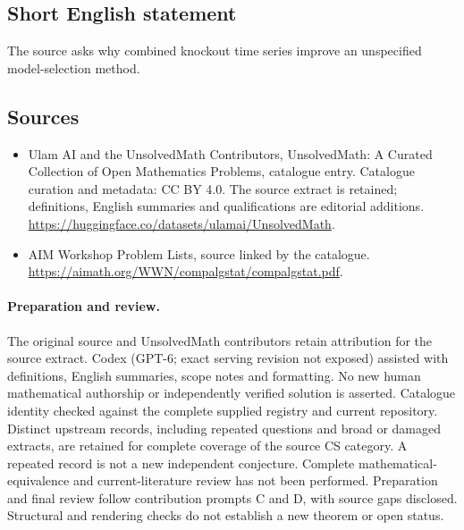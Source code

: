 \documentclass[11pt]{article}
\begin{document}
\subsection{Short English statement}
The source asks why combined knockout time series improve an unspecified model-selection method.
\subsection{Sources}
\begin{itemize}
\item[\hypertarget{source:statement:1}{S1}] Ulam AI and the UnsolvedMath Contributors, UnsolvedMath: A Curated Collection of Open Mathematics Problems, catalogue entry. Catalogue curation and metadata: CC BY 4.0. The source extract is retained; definitions, English summaries and qualifications are editorial additions.
\url{https://huggingface.co/datasets/ulamai/UnsolvedMath}.
\item[\hypertarget{source:statement:2}{S2}] AIM Workshop Problem Lists, source linked by the catalogue.
\url{https://aimath.org/WWN/compalgstat/compalgstat.pdf}.
\end{itemize}
\paragraph{Preparation and review.}
The original source and UnsolvedMath contributors retain attribution for the source extract. Codex (GPT-6; exact serving revision not exposed) assisted with definitions, English summaries, scope notes and formatting. No new human mathematical authorship or independently verified solution is asserted. Catalogue identity checked against the complete supplied registry and current repository. Distinct upstream records, including repeated questions and broad or damaged extracts, are retained for complete coverage of the source CS category. A repeated record is not a new independent conjecture. Complete mathematical-equivalence and current-literature review has not been performed. Preparation and final review follow contribution prompts C and D, with source gaps disclosed. Structural and rendering checks do not establish a new theorem or open status.
\label{end:statement}
\end{document}
